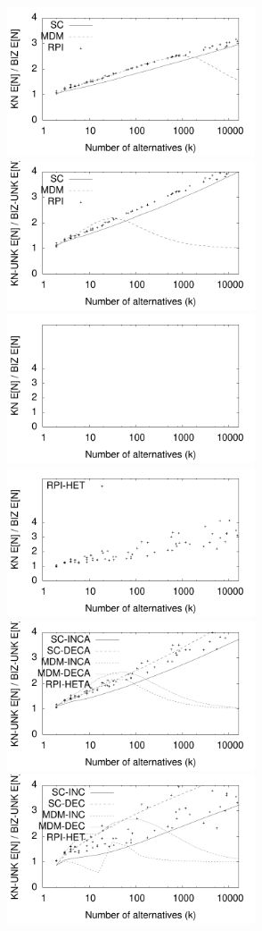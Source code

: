 \documentclass[12pt]{article}
\begin{document}
\begin{figure}[tb]
    \center
    \includegraphics[width=2.9in]{pdf/FINAL-Common-Known-ImprovementFactor}
    \includegraphics[width=2.9in]{pdf/FINAL-Common-Unknown-ImprovementFactor}
    \includegraphics[width=2.9in]{pdf/FINAL-HeteroA-Known-ImprovementFactor}
    \includegraphics[width=2.9in]{pdf/FINAL-Hetero-Known-ImprovementFactor}
    \includegraphics[width=2.9in]{pdf/FINAL-HeteroA-Unknown-ImprovementFactor}
    \includegraphics[width=2.9in]{pdf/FINAL-Hetero-Unknown-ImprovementFactor}


\end{figure}
\end{document}
